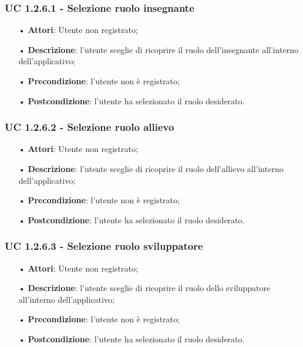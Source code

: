 \subsubsection{UC 1.2.6.1 - Selezione ruolo insegnante}
\begin{itemize}
	\item[•]\textbf{Attori}: Utente non registrato;
	\item[•]\textbf{Descrizione}: l'utente sceglie di ricoprire il ruolo dell'insegnante all'interno dell'applicativo;
	\item[•]\textbf{Precondizione}: l'utente non è registrato;
	\item[•]\textbf{Postcondizione}: l'utente ha selezionato il ruolo desiderato.
\end{itemize}

\subsubsection{UC 1.2.6.2 - Selezione ruolo allievo}
\begin{itemize}
	\item[•]\textbf{Attori}: Utente non registrato;
	\item[•]\textbf{Descrizione}: l'utente sceglie di ricoprire il ruolo dell'allievo all'interno dell'applicativo;
	\item[•]\textbf{Precondizione}: l'utente non è registrato;
	\item[•]\textbf{Postcondizione}: l'utente ha selezionato il ruolo desiderato.
\end{itemize}

\subsubsection{UC 1.2.6.3 - Selezione ruolo sviluppatore}
\begin{itemize}
	\item[•]\textbf{Attori}: Utente non registrato;
	\item[•]\textbf{Descrizione}: l'utente sceglie di ricoprire il ruolo dello sviluppatore all'interno dell'applicativo;
	\item[•]\textbf{Precondizione}: l'utente non è registrato;
	\item[•]\textbf{Postcondizione}: l'utente ha selezionato il ruolo desiderato.
\end{itemize}

